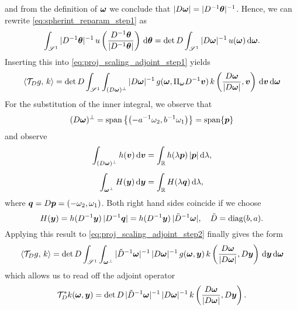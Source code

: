 \documentclass{amsart}
\newcommand*{\Dinv}{{\ensuremath{D^{-1}}}}
\begin{document}
%
and from the definition of ${\boldsymbol{\omega}}$ we conclude that $\abs{D \Bomega} = \abs{\Dinv \Btheta}^{-1}$. Hence, we can rewrite 
\eqref{eq:spherint_reparam_step1} as
%
\begin{equation}
 \label{eq:spherint_reparam}
 \int_{\Sphere^1} \abs{\Dinv \Btheta}^{-1}\, u\left(\frac{\Dinv\Btheta}{\abs{\Dinv\Btheta}}\right)\, \diff \Btheta = 
 \det D \int_{\Sphere^1} \abs{D \Bomega}^{-1}\, u(\Bomega)\, \diff\Bomega.
\end{equation} 
%
Inserting this into \eqref{eq:proj_scaling_adjoint_step1} yields
%
\begin{equation}
 \label{eq:proj_scaling_adjoint_step2}
 \spr{\Top_D g}{k} = \det D \int_{\Sphere^1} \int_{(D\Bomega)^\perp} \abs{D \Bomega}^{-1}\, g(\Bomega, \Pi_\Bomega \Dinv\Bv)\, 
 k\left(\frac{D \Bomega}{\abs{D \Bomega}}, \Bv\right)\, \diff\Bv\, \diff\Bomega
\end{equation} 
%
For the substitution of the inner integral, we observe that
%
\begin{equation*}
 (D{\boldsymbol{\omega}})^\perp = \operatorname*{span}\left\lbrace \left(-a^{-1}\omega_2, b^{-1}\omega_1\right) \right\rbrace = \operatorname*{span}\lbrace {\boldsymbol{p}} \rbrace
\end{equation*}
%
and observe
%
\begin{align*}
 \int_{(D{\boldsymbol{\omega}})^\perp} h({\boldsymbol{v}})\, \mathrm{d} {\boldsymbol{v}} 
 &= \int_{\mathbb{R}} h(\lambda {\boldsymbol{p}})\, |{\boldsymbol{p}}|\, \mathrm{d}\lambda,\\[1ex]
 \int_{{\boldsymbol{\omega}}^\perp} H({\boldsymbol{y}})\, \mathrm{d} {\boldsymbol{y}}
 &= \int_{\mathbb{R}} H(\lambda {\boldsymbol{q}})\, \mathrm{d}\lambda,
\end{align*}
%
where ${\boldsymbol{q}} = D{\boldsymbol{p}} = (-\omega_2, \omega_1)$. Both right hand sides coincide if we choose 
%
\begin{equation*}
 H(\By) = h(\Dinv \By)\, \abs{\Dinv \Bq} = h(\Dinv \By)\, \abs{\tilde D^{-1} \Bomega},\quad \tilde D = \DIAG(b,a).
\end{equation*}
%
Applying this result to \eqref{eq:proj_scaling_adjoint_step2} finally gives the form
%
\begin{equation}
 \label{eq:proj_scaling_adjoint_final}
 \langle {\ensuremath{\mathcal{T}}}_D g,\,k\rangle = \det D \int_{\mathscr{S}^1} \int_{{\boldsymbol{\omega}}^\perp} |\tilde D^{-1} {\boldsymbol{\omega}}|^{-1}\, |D {\boldsymbol{\omega}}|^{-1}\, 
 g({\boldsymbol{\omega}}, {\boldsymbol{y}})\, k\left(\frac{D {\boldsymbol{\omega}}}{|D {\boldsymbol{\omega}}|}, D {\boldsymbol{y}}\right)\, \mathrm{d}{\boldsymbol{y}}\, \mathrm{d}{\boldsymbol{\omega}}
\end{equation} 
%
which allows us to read off the adjoint operator
%
\begin{equation}
 \label{eq:proj_scaling_adjoint}
 {\ensuremath{\mathcal{T}}}_D^* k({\boldsymbol{\omega}}, {\boldsymbol{y}}) = \det D\, |\tilde D^{-1} {\boldsymbol{\omega}}|^{-1}\, |D {\boldsymbol{\omega}}|^{-1}\, 
 k\left(\frac{D {\boldsymbol{\omega}}}{|D {\boldsymbol{\omega}}|}, D {\boldsymbol{y}}\right).
\end{equation}
\end{document}
